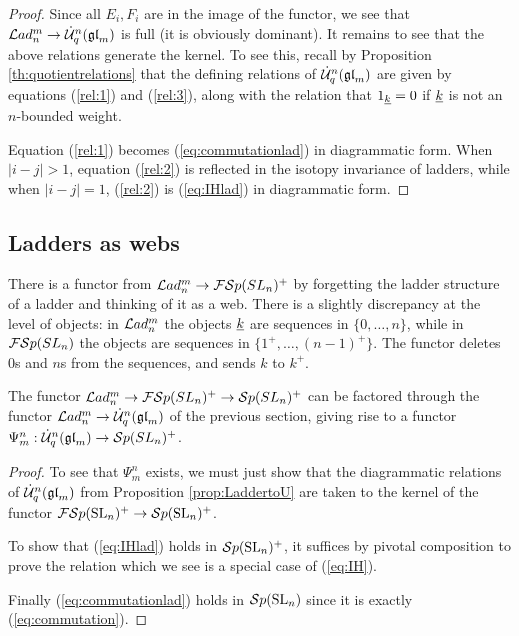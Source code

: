 \documentclass[10pt,leqno]{article}
\begin{document}

\begin{proof}
Since all $ E_i, F_i $ are in the image of the functor, we see that $ \mathcal{L}ad_n^m \rightarrow \dot{{\mathcal{U}}}_q^n({\mathfrak{gl}}_m) $ is full (it is obviously dominant).  It remains to see that the above relations generate the kernel.  To see this, recall by Proposition \ref{th:quotientrelations} that the defining relations of $ \dot{{\mathcal{U}}}_q^n({\mathfrak{gl}}_m) $ are given by equations (\ref{rel:1}) and (\ref{rel:3}), along with the relation that $ 1_{{\underline{k}}} = 0 $ if $ {\underline{k}} $ is not an $ n$-bounded weight.
 
Equation (\ref{rel:1}) becomes (\ref{eq:commutationlad}) in diagrammatic form.  When $ |i-j| > 1 $, equation (\ref{rel:2}) is reflected in the isotopy invariance of ladders, while when $ |i-j |= 1$, (\ref{rel:2}) is (\ref{eq:IHlad}) in diagrammatic form. 
\end{proof}

\subsection{Ladders as webs}\label{sec:psi}
There is a functor from $ \mathcal{L}ad_n^m \rightarrow {\mathcal{FS}p}(SL_n)^+$  by forgetting the ladder structure of a ladder and thinking of it as a web. There is a slightly discrepancy at the level of objects: in $\mathcal{L}ad_n^m$ the objects ${\underline{k}}$ are sequences in $\{0,\ldots,n\}$, while in ${\mathcal{FS}p}(SL_n)$ the objects are sequences in $\{1^+,\ldots,(n-1)^+\}$. The functor deletes $0$s and $n$s from the sequences, and sends $k$ to $k^+$.

\begin{prop}
\label{prop:psi}
The functor $\mathcal{L}ad_n^m \to {\mathcal{FS}p}(SL_n)^+ \to {\mathcal{S}p}(SL_n)^+$ can be factored through the functor $\mathcal{L}ad_n^m \to \dot{{\mathcal{U}}}_q^n({\mathfrak{gl}}_m)$ of the previous section, giving rise to a functor $\Psi_m^n : \dot{{\mathcal{U}}}_q^n({\mathfrak{gl}}_m) \to {\mathcal{S}p}(SL_n)^+$.
\end{prop}
\begin{proof}
To see that $ \Psi_m^n $ exists, we must just show that the diagrammatic relations of $ \dot{{\mathcal{U}}}_q^n({\mathfrak{gl}}_m) $ from Proposition \ref{prop:LaddertoU} are taken to the kernel of the functor $ {\mathcal{FS}p}({\rm{SL}}_n)^+ \to {\mathcal{S}p}({\rm{SL}}_n)^+ $.

To show that (\ref{eq:IHlad}) holds in $ {\mathcal{S}p}({\rm{SL}}_n)^+ $, it suffices by pivotal composition to prove the relation
which we see is a special case of (\ref{eq:IH}).

Finally (\ref{eq:commutationlad}) holds in ${\mathcal{S}p}({\rm{SL}}_n) $ since it is exactly (\ref{eq:commutation}).
\end{proof}
\end{document}
